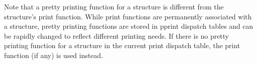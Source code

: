 Note that a pretty printing function for a structure is different from the
structure's print function.  While print functions are permanently
associated with a structure, pretty printing functions are stored in pprint
dispatch tables and can be rapidly changed to reflect different printing
needs.  If there is no pretty printing function for a structure in the
current print dispatch table, the print function (if any) is used instead.

